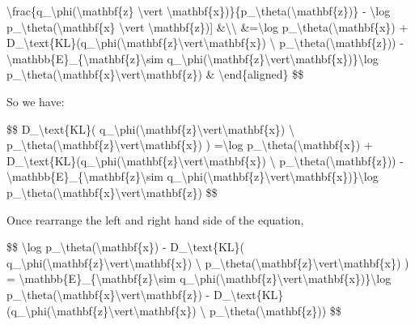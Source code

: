 \textbackslash frac\{q\_\textbackslash phi(\textbackslash mathbf\{z\} \textbackslash vert \textbackslash mathbf\{x\})\}\{p\_\textbackslash theta(\textbackslash mathbf\{z\})\} - \textbackslash log p\_\textbackslash theta(\textbackslash mathbf\{x\} \textbackslash vert \textbackslash mathbf\{z\}){]} \&\textbackslash\textbackslash{} \&=\textbackslash log p\_\textbackslash theta(\textbackslash mathbf\{x\}) + D\_\textbackslash text\{KL\}(q\_\textbackslash phi(\textbackslash mathbf\{z\}\textbackslash vert\textbackslash mathbf\{x\}) \textbackslash\textbar{} p\_\textbackslash theta(\textbackslash mathbf\{z\})) - \textbackslash mathbb\{E\}\_\{\textbackslash mathbf\{z\}\textbackslash sim q\_\textbackslash phi(\textbackslash mathbf\{z\}\textbackslash vert\textbackslash mathbf\{x\})\}\textbackslash log p\_\textbackslash theta(\textbackslash mathbf\{x\}\textbackslash vert\textbackslash mathbf\{z\}) \& \textbackslash end\{aligned\} \$\$

So we have:

\$\$ D\_\textbackslash text\{KL\}( q\_\textbackslash phi(\textbackslash mathbf\{z\}\textbackslash vert\textbackslash mathbf\{x\}) \textbackslash\textbar{} p\_\textbackslash theta(\textbackslash mathbf\{z\}\textbackslash vert\textbackslash mathbf\{x\}) ) =\textbackslash log p\_\textbackslash theta(\textbackslash mathbf\{x\}) + D\_\textbackslash text\{KL\}(q\_\textbackslash phi(\textbackslash mathbf\{z\}\textbackslash vert\textbackslash mathbf\{x\}) \textbackslash\textbar{} p\_\textbackslash theta(\textbackslash mathbf\{z\})) - \textbackslash mathbb\{E\}\_\{\textbackslash mathbf\{z\}\textbackslash sim q\_\textbackslash phi(\textbackslash mathbf\{z\}\textbackslash vert\textbackslash mathbf\{x\})\}\textbackslash log p\_\textbackslash theta(\textbackslash mathbf\{x\}\textbackslash vert\textbackslash mathbf\{z\}) \$\$

Once rearrange the left and right hand side of the equation,

\$\$ \textbackslash log p\_\textbackslash theta(\textbackslash mathbf\{x\}) - D\_\textbackslash text\{KL\}( q\_\textbackslash phi(\textbackslash mathbf\{z\}\textbackslash vert\textbackslash mathbf\{x\}) \textbackslash\textbar{} p\_\textbackslash theta(\textbackslash mathbf\{z\}\textbackslash vert\textbackslash mathbf\{x\}) ) = \textbackslash mathbb\{E\}\_\{\textbackslash mathbf\{z\}\textbackslash sim q\_\textbackslash phi(\textbackslash mathbf\{z\}\textbackslash vert\textbackslash mathbf\{x\})\}\textbackslash log p\_\textbackslash theta(\textbackslash mathbf\{x\}\textbackslash vert\textbackslash mathbf\{z\}) - D\_\textbackslash text\{KL\}(q\_\textbackslash phi(\textbackslash mathbf\{z\}\textbackslash vert\textbackslash mathbf\{x\}) \textbackslash\textbar{} p\_\textbackslash theta(\textbackslash mathbf\{z\})) \$\$

